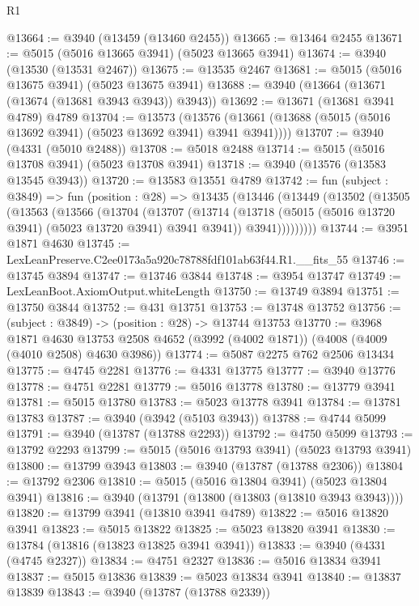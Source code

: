 \begin{lexlean}{R1}
\begin{coremodule}
@13664 := @3940 (@13459 (@13460 @2455))
@13665 := @13464 @2455
@13671 := @5015 (@5016 @13665 @3941) (@5023 @13665 @3941)
@13674 := @3940 (@13530 (@13531 @2467))
@13675 := @13535 @2467
@13681 := @5015 (@5016 @13675 @3941) (@5023 @13675 @3941)
@13688 := @3940 (@13664 (@13671 (@13674 (@13681 @3943 @3943)) @3943))
@13692 := @13671 (@13681 @3941 @4789) @4789
@13704 := @13573
    (@13576 (@13661 (@13688 (@5015 (@5016 @13692 @3941) (@5023 @13692 @3941) @3941 @3941))))
@13707 := @3940 (@4331 (@5010 @2488))
@13708 := @5018 @2488
@13714 := @5015 (@5016 @13708 @3941) (@5023 @13708 @3941)
@13718 := @3940 (@13576 (@13583 @13545 @3943))
@13720 := @13583 @13551 @4789
@13742 := fun (subject : @3849) =>
  fun (position : @28) =>
  @13435
    (@13446
      (@13449
        (@13502
          (@13505
            (@13563
              (@13566
                (@13704
                  (@13707
                    (@13714
                      (@13718 (@5015 (@5016 @13720 @3941) (@5023 @13720 @3941) @3941 @3941))
                      @3941)))))))))
@13744 := @3951 @1871 @4630
@13745 := LexLeanPreserve.C2ee0173a5a920c78788fdf101ab63f44.R1.__fits_55
@13746 := @13745 @3894
@13747 := @13746 @3844
@13748 := @3954 @13747
@13749 := LexLeanBoot.AxiomOutput.whiteLength
@13750 := @13749 @3894
@13751 := @13750 @3844
@13752 := @431 @13751
@13753 := @13748 @13752
@13756 := (subject : @3849) -> (position : @28) -> @13744 @13753
@13770 := @3968
    @1871
    @4630
    @13753
    @2508
    @4652
    (@3992 (@4002 @1871))
    (@4008 (@4009 (@4010 @2508) @4630 @3986))
@13774 := @5087 @2275 @762 @2506 @13434
@13775 := @4745 @2281
@13776 := @4331 @13775
@13777 := @3940 @13776
@13778 := @4751 @2281
@13779 := @5016 @13778
@13780 := @13779 @3941
@13781 := @5015 @13780
@13783 := @5023 @13778 @3941
@13784 := @13781 @13783
@13787 := @3940 (@3942 (@5103 @3943))
@13788 := @4744 @5099
@13791 := @3940 (@13787 (@13788 @2293))
@13792 := @4750 @5099
@13793 := @13792 @2293
@13799 := @5015 (@5016 @13793 @3941) (@5023 @13793 @3941)
@13800 := @13799 @3943
@13803 := @3940 (@13787 (@13788 @2306))
@13804 := @13792 @2306
@13810 := @5015 (@5016 @13804 @3941) (@5023 @13804 @3941)
@13816 := @3940 (@13791 (@13800 (@13803 (@13810 @3943 @3943))))
@13820 := @13799 @3941 (@13810 @3941 @4789)
@13822 := @5016 @13820 @3941
@13823 := @5015 @13822
@13825 := @5023 @13820 @3941
@13830 := @13784 (@13816 (@13823 @13825 @3941 @3941))
@13833 := @3940 (@4331 (@4745 @2327))
@13834 := @4751 @2327
@13836 := @5016 @13834 @3941
@13837 := @5015 @13836
@13839 := @5023 @13834 @3941
@13840 := @13837 @13839
@13843 := @3940 (@13787 (@13788 @2339))

\end{coremodule}
\end{lexlean}
